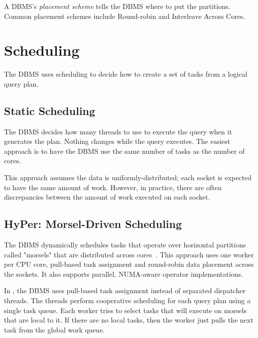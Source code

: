 \documentclass[11pt]{article}
\begin{document}
A DBMS's \textit{placement scheme} tells the DBMS where to put the partitions. Common 
placement schemes include Round-robin and Interleave Across Cores.

\section{Scheduling}
The DBMS uses scheduling to decide how to create a set of tasks from a logical query plan.

\subsection*{Static Scheduling}
The DBMS decides how many threads to use to execute the query when it generates the plan. 
Nothing changes while the query executes. The easiest approach is to have the DBMS use the same 
number of tasks as the number of cores.

This approach assumes the data is uniformly-distributed; each socket is expected to have the 
same amount of work. However, in practice, there are often discrepancies between the amount of work 
executed on each socket.

\subsection*{HyPer: Morsel-Driven Scheduling}
The DBMS dynamically schedules tasks that operate over horizontal partitions called "morsels" that 
are distributed across cores~\cite{10.1145/2588555.2610507}. This approach uses one worker per CPU 
core, pull-based task assignment and round-robin data placement across the sockets. It also supports 
parallel, NUMA-aware operator implementations.

In , the DBMS uses pull-based task assignment instead of separated dispatcher 
threads. The threads perform cooperative scheduling for each query plan using a single task queue. 
Each worker tries to select tasks that will execute on morsels that are local to it. If there are 
no local tasks, then the worker just pulls the next task from the global work queue.
\end{document}
